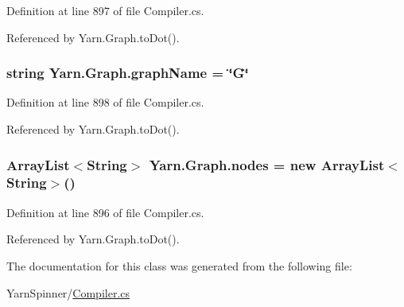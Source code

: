 Definition at line 897 of file Compiler.\-cs.



Referenced by Yarn.\-Graph.\-to\-Dot().

\hypertarget{a00103_a8605f1ec5a4e9cfd07d3ac2be042dac6}{
\subsubsection[{graph\-Name}]{\setlength{\rightskip}{0pt plus 5cm}string Yarn.\-Graph.\-graph\-Name = \char`\"{}G\char`\"{}}}\label{a00103_a8605f1ec5a4e9cfd07d3ac2be042dac6}


Definition at line 898 of file Compiler.\-cs.



Referenced by Yarn.\-Graph.\-to\-Dot().

\hypertarget{a00103_a506df6f737a41748c01239bdea5d82b1}{
\subsubsection[{nodes}]{\setlength{\rightskip}{0pt plus 5cm}Array\-List$<${\bf String}$>$ Yarn.\-Graph.\-nodes = new Array\-List$<${\bf String}$>$()}}\label{a00103_a506df6f737a41748c01239bdea5d82b1}


Definition at line 896 of file Compiler.\-cs.



Referenced by Yarn.\-Graph.\-to\-Dot().



The documentation for this class was generated from the following file\-:\begin{DoxyCompactItemize}
\item 
Yarn\-Spinner/\hyperlink{a00281}{Compiler.\-cs}\end{DoxyCompactItemize}
